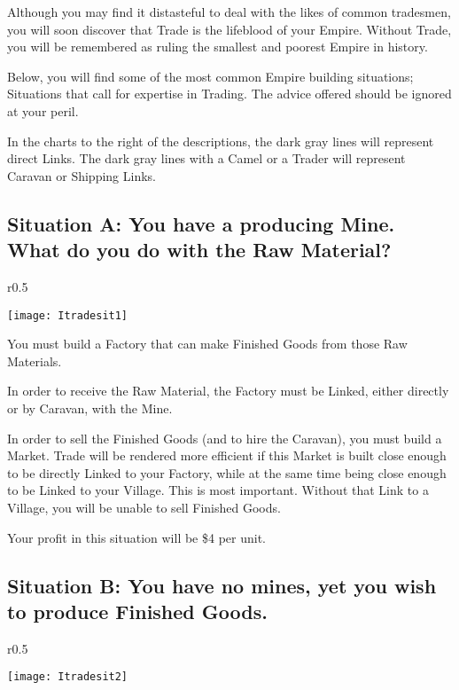 Although you may find it distasteful to deal with the likes of common tradesmen, you will soon discover that Trade is the lifeblood of your Empire. Without Trade, you will be remembered as ruling the smallest and poorest Empire in history.

Below, you will find some of the most common Empire building situations; Situations that call for expertise in Trading. The advice offered should be ignored at your peril.

In the charts to the right of the descriptions, the dark gray lines will represent direct Links. The dark gray lines with a Camel or a Trader will represent Caravan or Shipping Links.

\subsection{Situation A: You have a producing Mine. What do you do with the Raw Material?}

\begin{wrapfigure}{r}{0.5\textwidth}
	\vspace{-20pt}
	\begin{center}
		\texttt{[image: Itradesit1]}
	\end{center}
	\vspace{-20pt}
\end{wrapfigure}

You must build a Factory that can make Finished Goods from those Raw Materials.

In order to receive the Raw Material, the Factory must be Linked, either directly or by Caravan, with the Mine.

In order to sell the Finished Goods (and to hire the Caravan), you must build a Market. Trade will be rendered more efficient if this Market is built close enough to be directly Linked to your Factory, while at the same time being close enough to be Linked to your Village. This is most important. Without that Link to a Village, you will be unable to sell Finished Goods.

Your profit in this situation will be \$4 per unit.

\clearpage

\subsection{Situation B: You have no mines, yet you wish to produce Finished Goods.}

\begin{wrapfigure}{r}{0.5\textwidth}
	\vspace{-20pt}
	\begin{center}
		\texttt{[image: Itradesit2]}
	\end{center}
	\vspace{-20pt}
\end{wrapfigure}

